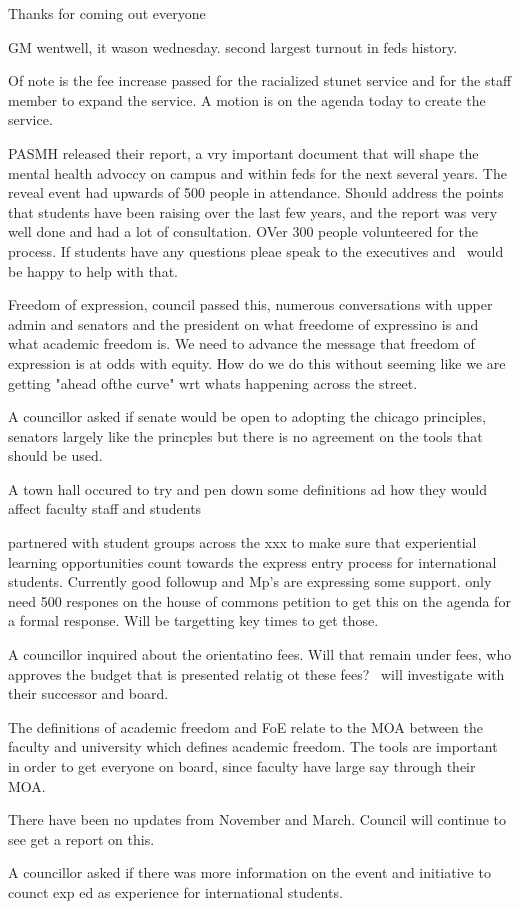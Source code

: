 \begin{information}

    Thanks for coming out everyone

    GM wentwell, it wason wednesday. second largest turnout in feds history.

    Of note is the fee increase passed for the racialized stunet service and
    for the staff member to expand the service. A motion is on the agenda today
    to create the service.

    PASMH released their report, a vry important document that will shape the mental
    health advoccy on campus and within feds for the next several years. The
    reveal event had upwards of 500 people in attendance. Should address
    the points that students have been raising over the last few years, and
    the report was very well done and had a lot of consultation. OVer 300
    people volunteered for the process. If students have any questions
    pleae speak to the executives and \pres\ would be happy to help with that.

    Freedom of expression, council passed this, numerous conversations with
    upper admin and senators and the president on what freedome of
    expressino is and what academic freedom is. We need to advance the message
    that freedom of expression is at odds with equity. How do we do this without
    seeming like we are getting "ahead ofthe curve" wrt whats happening across
    the street. 

    A councillor asked if senate would be open to adopting the chicago principles,
    senators largely like the princples but there is no agreement on the tools 
    that should be used.

    A town hall occured to try and pen down some definitions ad how they would 
    affect faculty staff and students

    partnered with student groups across the xxx to make sure that experiential
    learning opportunities count towards the express entry process for 
    international students. Currently good followup and Mp's are expressing
    some support. only need 500 respones on the house of commons petition to 
    get this on the agenda for a formal response. Will be targetting key times
    to get those.

    A councillor inquired about the orientatino fees. Will that remain under
    fees, who approves the budget that is presented relatig ot these fees? \pres\ 
    will investigate with their successor and board.

    The definitions of academic freedom and FoE relate to the MOA between the
    faculty and university which defines academic freedom. The tools are 
    important in order to get everyone on board, since faculty have large
    say through their MOA.

    There have been no updates from November and March. Council will continue
    to see get a report on this.

    A councillor asked if there was more information on the event and initiative
    to counct exp ed as experience for international students.

\end{information}

